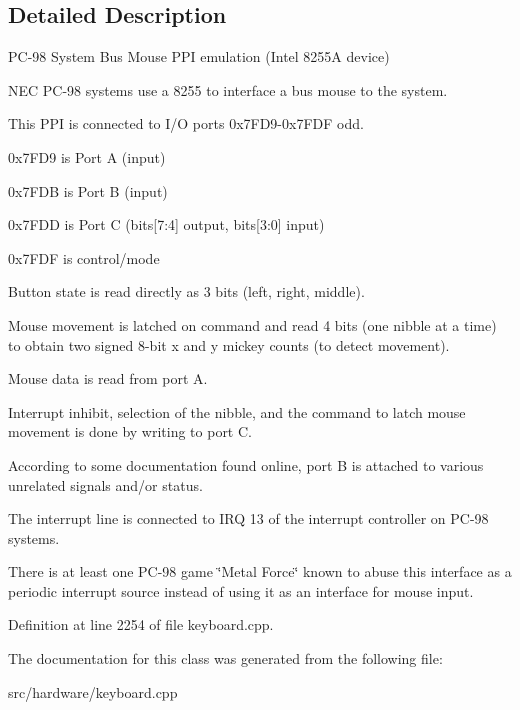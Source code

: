 \subsection{Detailed Description}
P\-C-\/98 System Bus Mouse P\-P\-I emulation (Intel 8255\-A device) 

N\-E\-C P\-C-\/98 systems use a 8255 to interface a bus mouse to the system.

This P\-P\-I is connected to I/\-O ports 0x7\-F\-D9-\/0x7\-F\-D\-F odd.
\begin{DoxyItemize}
\item 0x7\-F\-D9 is Port A (input)
\item 0x7\-F\-D\-B is Port B (input)
\item 0x7\-F\-D\-D is Port C (bits\mbox{[}7\-:4\mbox{]} output, bits\mbox{[}3\-:0\mbox{]} input)
\item 0x7\-F\-D\-F is control/mode
\end{DoxyItemize}

Button state is read directly as 3 bits (left, right, middle).

Mouse movement is latched on command and read 4 bits (one nibble at a time) to obtain two signed 8-\/bit x and y mickey counts (to detect movement).

Mouse data is read from port A.

Interrupt inhibit, selection of the nibble, and the command to latch mouse movement is done by writing to port C.

According to some documentation found online, port B is attached to various unrelated signals and/or status.

The interrupt line is connected to I\-R\-Q 13 of the interrupt controller on P\-C-\/98 systems.

There is at least one P\-C-\/98 game \char`\"{}\-Metal Force\char`\"{} known to abuse this interface as a periodic interrupt source instead of using it as an interface for mouse input. 

Definition at line 2254 of file keyboard.\-cpp.



The documentation for this class was generated from the following file\-:\begin{DoxyCompactItemize}
\item 
src/hardware/keyboard.\-cpp\end{DoxyCompactItemize}
